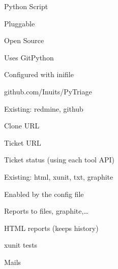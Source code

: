 \begin{iframe}[PyTriage]
\item Python Script
\item Pluggable
\item Open Source
\item Uses GitPython
\item Configured with inifile
\item github.com/Inuits/PyTriage
\end{iframe}
\begin{iframe}
\item Existing: redmine, github
\item Clone URL
\item Ticket URL
\item Ticket status (using each tool API)
\end{iframe}
\begin{iframe}
\item Existing: html, xunit, txt, graphite
\item Enabled by the config file
\item Reports to files, graphite,\dots
\end{iframe}

\begin{iframe}
\item HTML reports (keeps history)
\item xunit tests
\item Mails
\end{iframe}

